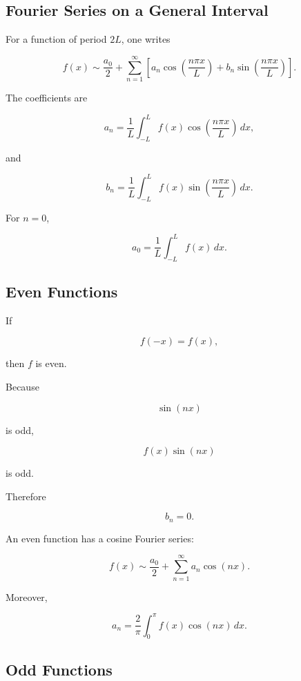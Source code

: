 \subsection{Fourier Series on a General Interval}
\label{subsec:fourier-general-interval}

For a function of period \(2L\), one writes

\[
\boxed{
f(x)
\sim
\frac{a_0}{2}
+
\sum_{n=1}^{\infty}
\left[
a_n
\cos\left(\frac{n\pi x}{L}\right)
+
b_n
\sin\left(\frac{n\pi x}{L}\right)
\right].
}
\]

The coefficients are

\[
\boxed{
a_n
=
\frac1L
\int_{-L}^{L}
f(x)
\cos\left(\frac{n\pi x}{L}\right)
\,dx,
}
\]

and

\[
\boxed{
b_n
=
\frac1L
\int_{-L}^{L}
f(x)
\sin\left(\frac{n\pi x}{L}\right)
\,dx.
}
\]

For \(n=0\),

\[
\boxed{
a_0
=
\frac1L
\int_{-L}^{L}f(x)\,dx.
}
\]

\subsection{Even Functions}
\label{subsec:even-fourier-series}

If

\[
f(-x)=f(x),
\]

then \(f\) is even.

Because

\[
\sin(nx)
\]

is odd,

\[
f(x)\sin(nx)
\]

is odd.

Therefore

\[
\boxed{
b_n=0.
}
\]

An even function has a cosine Fourier series:

\[
\boxed{
f(x)
\sim
\frac{a_0}{2}
+
\sum_{n=1}^{\infty}
a_n\cos(nx).
}
\]

Moreover,

\[
\boxed{
a_n
=
\frac{2}{\pi}
\int_0^\pi
f(x)\cos(nx)\,dx.
}
\]

\subsection{Odd Functions}
\label{subsec:odd-fourier-series}

